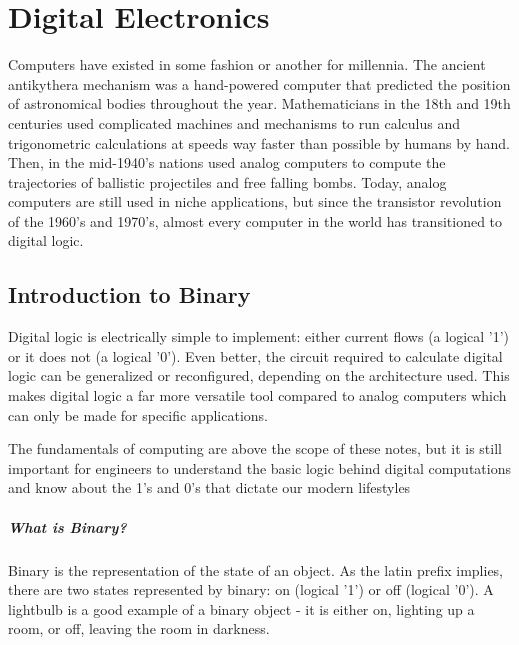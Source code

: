 %

\chapter{Digital Electronics}
\setchapterpreamble[u]{\margintoc}

Computers have existed in some fashion or another for millennia.
The ancient antikythera mechanism was a hand-powered computer that predicted the position of astronomical bodies throughout the year.
Mathematicians in the 18th and 19th centuries used complicated machines and mechanisms to run calculus and trigonometric calculations at speeds way faster than possible by humans by hand.
Then, in the mid-1940's nations used analog computers to compute the trajectories of ballistic projectiles and free falling bombs.
Today, analog computers are still used in niche applications, but since the transistor revolution of the 1960's and 1970's, almost every computer in the world has transitioned to digital logic.

\section[Introduction to Binary]{Introduction to Binary}
Digital logic is electrically simple to implement: either current flows (a logical '1') or it does not (a logical '0').
Even better, the circuit required to calculate digital logic can be generalized or reconfigured, depending on the architecture used.
This makes digital logic a far more versatile tool compared to analog computers which can only be made for specific applications.

The fundamentals of computing are above the scope of these notes, but it is still important for engineers to understand the basic logic behind digital computations and know about the 1's and 0's that dictate our modern lifestyles

\paragraph*{What is Binary?} Binary is the representation of the state of an object.
As the latin prefix implies, there are two states represented by binary: on (logical '1') or off (logical '0').
A lightbulb is a good example of a binary object - it is either on, lighting up a room, or off, leaving the room in darkness.

